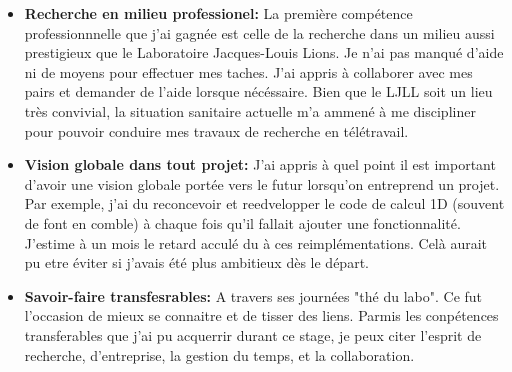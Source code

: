 \begin{itemize}
    \item \textbf{Recherche en milieu professionel:} La première compétence professionnnelle que j'ai gagnée est celle de la recherche dans un milieu aussi prestigieux que le Laboratoire Jacques-Louis Lions. Je n'ai pas manqué d'aide ni de moyens pour effectuer mes taches. J'ai appris à collaborer avec mes pairs et demander de l'aide lorsque nécéssaire. Bien que le LJLL soit un lieu très convivial, la situation sanitaire actuelle m'a ammené à me discipliner pour pouvoir conduire mes travaux de recherche en télétravail.
    \item \textbf{Vision globale dans tout projet:} J'ai appris à quel point il est important d'avoir une vision globale portée vers le futur lorsqu'on entreprend un projet. Par exemple, j'ai du reconcevoir et reedvelopper le code de calcul 1D (souvent de font en comble) à chaque fois qu'il fallait ajouter une fonctionnalité. J'estime à un mois le retard acculé du à ces reimplémentations. Celà aurait pu etre éviter si j'avais été plus ambitieux dès le départ.
    \item \textbf{Savoir-faire transfesrables:} A travers ses journées "thé du labo". Ce fut l'occasion de mieux se connaitre et de tisser des liens. Parmis les conpétences transferables que j'ai pu acquerrir durant ce stage, je peux citer l'esprit de recherche, d'entreprise, la gestion du temps, et la collaboration.
\end{itemize}